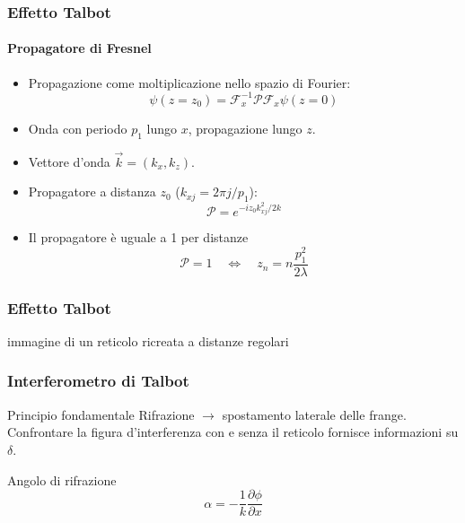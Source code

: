 \documentclass[italian]{beamer}
\begin{document}
\begin{frame}
    \frametitle{Effetto Talbot}
    \framesubtitle{Propagatore di Fresnel}
    \begin{itemize}
        \item Propagazione come moltiplicazione nello spazio di Fourier:
            \begin{equation*}
                \psi(z=z_0) = \mathcal{F}_x^{-1}\mathcal{P}\mathcal{F}_x
                \psi(z=0)
            \end{equation*}
        \item Onda con periodo $p_1$ lungo $x$, propagazione lungo $z$.
        \item Vettore d'onda $\vec{k} = (k_x, k_z)$.
        \item Propagatore a distanza $z_0$ ($k_{xj} = 2\pi j/p_1$):
            \begin{equation*}
                \mathcal{P} = e^{-iz_0 k_{xj}^2 / 2k}
            \end{equation*}
        \item Il propagatore \`e uguale a \num{1} per distanze
            \begin{equation*}
                \mathcal{P} = 1 \quad \Longleftrightarrow \quad z_n = n \frac{p_1^2}{2 \lambda}
            \end{equation*}
    \end{itemize}
\end{frame}

\begin{frame}
    \frametitle{Effetto Talbot}
    \begin{block}{}
        immagine di un reticolo ricreata a distanze regolari
    \end{block}
    \begin{figure}[h!]
        \centering
        \resizebox{.7\textwidth}{!}{}
    \end{figure}
\end{frame}

\begin{frame}
    \frametitle{Interferometro di Talbot}
    \begin{block}
        {Principio fondamentale}
        Rifrazione $\longrightarrow$ spostamento laterale delle frange.\\
        Confrontare la figura d'interferenza con e senza il reticolo
        fornisce informazioni su $\delta$.
    \end{block}
    Angolo di rifrazione 
    \begin{equation*}
        \alpha = - \frac{1}{k}\frac{\partial \phi}{\partial x}
    \end{equation*}
\end{frame}
\end{document}
